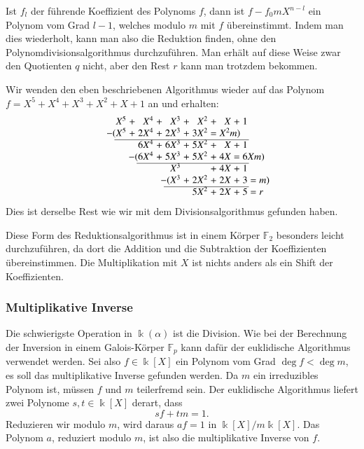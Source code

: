 Ist $f_l$ der führende Koeffizient des Polynoms $f$, dann ist
$f-f_0mX^{n-l}$ ein Polynom vom Grad $l-1$, welches modulo $m$
mit $f$ übereinstimmt.
Indem man dies wiederholt, kann man also die Reduktion finden, ohne
den Polynomdivisionsalgorithmus durchzuführen.
Man erhält auf diese Weise zwar den Quotienten $q$ nicht, aber den
Rest $r$ kann man trotzdem bekommen.

\begin{beispiel}
Wir wenden den eben beschriebenen Algorithmus wieder auf das
Polynom $f=X^5+X^4+X^3+X^2+X+1$ an und erhalten:
\[
\arraycolsep=1.4pt
\begin{array}{rcrcrcrcrcr}
X^5&+& X^4&+& X^3&+& X^2&+& X&+&1\\
\llap{$-($}X^5&+&2X^4&+&2X^3&+&3X^2\rlap{$\mathstrut =X^2m)$}& &  & & \\
\cline{1-11}
   & &6X^4&+&6X^3&+&5X^2&+& X&+&1\\
   & &\llap{$-($}6X^4&+&5X^3&+&5X^2&+&4X\rlap{$\mathstrut =6Xm)$}& & \\
\cline{3-11}
   & &    & & X^3& &    &+&4X&+&1\\
   & &    & & \llap{$-($}X^3&+&2X^2&+&2X&+&3\rlap{$\mathstrut =m)$}\\
\cline{5-11}
   & &    & &    & &5X^2&+&2X&+&5\rlap{$\mathstrut =r$}\\
\end{array}
\]
Dies ist derselbe Rest wie wir mit dem Divisionsalgorithmus
gefunden haben.
\end{beispiel}

Diese Form des Reduktionsalgorithmus ist in einem Körper $\mathbb{F}_2$
besonders leicht durchzuführen, da dort die Addition und die Subtraktion
der Koeffizienten übereinstimmen.
Die Multiplikation mit $X$ ist nichts anders als ein Shift der
Koeffizienten.

\subsubsection{Multiplikative Inverse}
Die schwierigste Operation in $\Bbbk(\alpha)$ ist die Division.
Wie bei der Berechnung der Inversion in einem Galois-Körper $\mathbb{F}_p$
kann dafür der euklidische Algorithmus verwendet werden.
Sei also $f\in\Bbbk[X]$ ein Polynom vom Grad $\deg f <\deg m$, es soll
das multiplikative Inverse gefunden werden.
Da $m$ ein irreduzibles Polynom ist, müssen $f$ und $m$ teilerfremd sein.
Der euklidische Algorithmus liefert zwei Polynome $s,t\in\Bbbk[X]$ derart,
dass
\[
sf+tm=1.
\]
Reduzieren wir modulo $m$, wird daraus $af=1$ in $\Bbbk[X]/m\Bbbk[X]$.
Das Polynom $a$, reduziert modulo $m$, ist also die multiplikative
Inverse von $f$.

